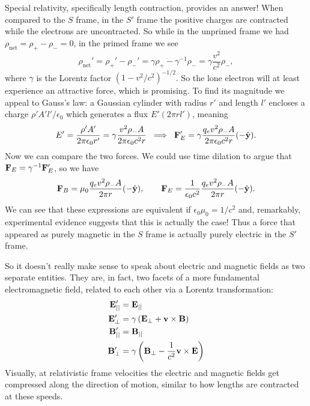 \documentclass[../p051main.tex]{subfiles}
\begin{document}
Special relativity, specifically length contraction, provides an answer!
When compared to the $S$ frame, in the $S'$ frame the positive charges are contracted while the electrons are uncontracted.
So while in the unprimed frame we had $\rho_\textrm{net} = \rho_+ - \rho_- = 0$, in the primed frame we see
\[ \rho_\textrm{net}' = \rho_+' - \rho_-' = \gamma \rho_+ - \gamma^{-1} \rho_- = \gamma \frac{v^2}{c^2} \rho_-, \]
where $\gamma$ is the Lorentz factor $\left( 1 - v^2 / c^2 \right)^{-1 / 2}$.
So the lone electron will at least experience an attractive force, which is promising.
To find its magnitude we appeal to Gauss's law: a Gaussian cylinder with radius $r'$ and length $l'$ encloses a charge $\rho' A' l' / \epsilon_0$ which generates a flux $E'(2\pi rl')$, meaning
\[ E' = \frac{\rho' A'}{2\pi \epsilon_0 r'} = \gamma \frac{v^2 \rho_- A}{2\pi \epsilon_0 c^2 r} \;\implies\; \mathbf{F}_E' = \gamma \frac{q_e v^2 \rho_- A}{2\pi \epsilon_0 c^2 r} (-\hat{\mathbf{y}}). \]
Now we can compare the two forces.
We could use time dilation to argue that $\mathbf{F}_E = \gamma^{-1} \mathbf{F}_E'$, so we have
\[ \mathbf{F}_B = \mu_0 \frac{q_e v^2 \rho_- A}{2\pi r} (-\hat{\mathbf{y}}), \qquad \mathbf{F}_E = \frac{1}{\epsilon_0 c^2} \frac{q_e v^2 \rho_- A}{2\pi r} (-\hat{\mathbf{y}}). \]
We can see that these expressions are equivalent if $\epsilon_0 \mu_0 = 1 / c^2$ and, remarkably, experimental evidence suggests that this is actually the case!
Thus a force that appeared as purely magnetic in the $S$ frame is actually purely electric in the $S'$ frame.

So it doesn't really make sense to speak about electric and magnetic fields as two separate entities.
They are, in fact, two facets of a more fundamental electromagnetic field, related to each other via a Lorentz transformation:
\begin{align*}
    \mathbf{E}_{||}' &= \mathbf{E}_{||} \\
    \mathbf{E}_\perp' &= \gamma \left( \mathbf{E}_\perp + \mathbf{v} \times \mathbf{B} \right) \\
    \mathbf{B}_{||}' &= \mathbf{B}_{||} \\
    \mathbf{B}_\perp' &= \gamma \left( \mathbf{B}_\perp - \frac{1}{c^2} \mathbf{v} \times \mathbf{E} \right)
\end{align*}
Visually, at relativistic frame velocities the electric and magnetic fields get compressed along the direction of motion, similar to how lengths are contracted at these speeds.
\end{document}
